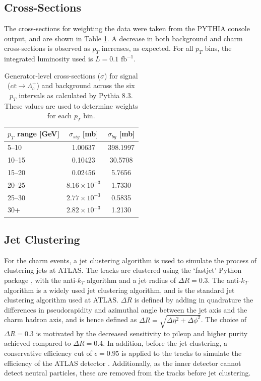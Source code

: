 \documentclass[12pt]{article}
\begin{document}
\subsection{Cross-Sections}
The cross-sections for weighting the data were taken from the PYTHIA console output, and are shown in Table \ref{tab:cross_sections}. A decrease in both background and charm cross-sections is observed as $p_T$ increases, as expected. For all $p_T$ bins, the integrated luminosity used is $L = 0.1 \text{ fb}^{-1}$.
\begin{table}[htbp]
    \centering
    \caption{Generator-level cross-sections ($\sigma$) for signal ($c\bar{c} \to \Lambda_c^+$) and background across the six $p_T$ intervals as calculated by Pythia 8.3. These values are used to determine weights for each $p_T$ bin.}
    \label{tab:cross_sections}
    \begin{tabular}{l c c}
        \toprule
        $p_T$ range [GeV] & $\sigma_{sig}$ [mb]   & $\sigma_{bg}$ [mb] \\
        \midrule
        5--10             & 1.00637               & 398.1997           \\
        10--15            & 0.10423               & 30.5708            \\
        15--20            & 0.02456               & 5.7656             \\
        20--25            & $8.16 \times 10^{-3}$ & 1.7330             \\
        25--30            & $2.77 \times 10^{-3}$ & 0.5835             \\
        30+               & $2.82 \times 10^{-3}$ & 1.2130             \\
        \bottomrule
    \end{tabular}
\end{table}

\subsection{Jet Clustering}
For the charm events, a jet clustering algorithm is used to simulate the process of clustering jets at ATLAS. The tracks are clustered using the `fastjet' Python package \cite{fastjet}, with the anti-$k_T$ algorithm \cite{antikt} and a jet radius of $\Delta R = 0.3$. The anti-$k_T$ algorithm is a widely used jet clustering algorithm, and is the standard jet clustering algorithm used at ATLAS. $\Delta R$ is defined by adding in quadrature the differences in pseudorapidity and azimuthal angle between the jet axis and the charm hadron axis, and is hence defined as $\Delta R = \sqrt{\Delta \eta^2 + \Delta \phi^2}$. The choice of $\Delta R = 0.3$ is motivated by the decreased sensitivity to pileup and higher purity achieved compared to $\Delta R = 0.4$. In addition, before the jet clustering, a conservative efficiency cut of $\epsilon = 0.95$ is applied to the tracks to simulate the efficiency of the ATLAS detector \cite{atlas_eff}. Additionally, as the inner detector cannot detect neutral particles, these are removed from the tracks before jet clustering.
\end{document}
